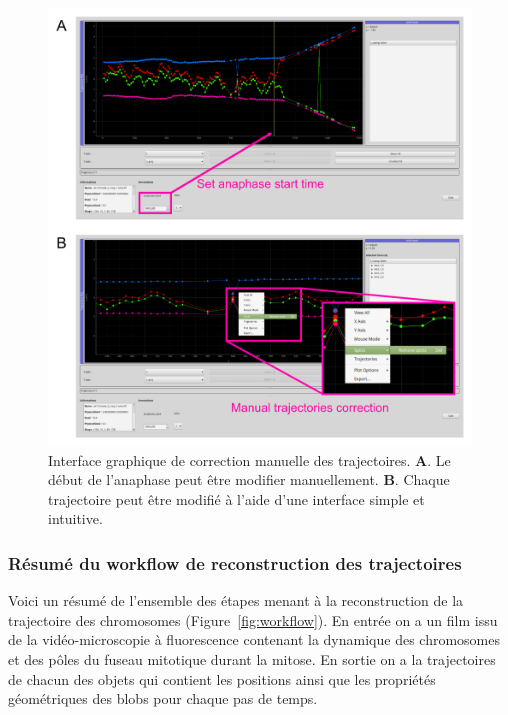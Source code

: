 \documentclass[12pt,a4paper,twoside,openright]{book}
\begin{document}
\begin{figure}[htbp]
\centering
\includegraphics{figures/results/imaging/gui.png}
\caption[Interface graphique de correction manuelle des trajectoires]{\label{fig:gui}Interface
graphique de correction manuelle des trajectoires. \textbf{A}. Le début
de l'anaphase peut être modifier manuellement. \textbf{B}. Chaque
trajectoire peut être modifié à l'aide d'une interface simple et
intuitive.}
\end{figure}

\subsubsection{Résumé du workflow de reconstruction des
trajectoires}\label{ruxe9sumuxe9-du-workflow-de-reconstruction-des-trajectoires}

Voici un résumé de l'ensemble des étapes menant à la reconstruction de
la trajectoire des chromosomes (Figure~\ref{fig:workflow}). En entrée on
a un film issu de la vidéo-microscopie à fluorescence contenant la
dynamique des chromosomes et des pôles du fuseau mitotique durant la
mitose. En sortie on a la trajectoires de chacun des objets qui contient
les positions ainsi que les propriétés géométriques des blobs pour
chaque pas de temps.
\end{document}
